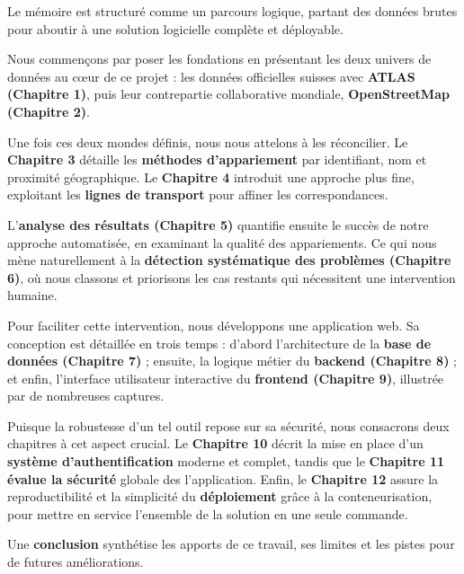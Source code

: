 Le mémoire est structuré comme un parcours logique, partant des données brutes pour aboutir à une solution logicielle complète et déployable. 

Nous commençons par poser les fondations en présentant les deux univers de données au cœur de ce projet : les données officielles suisses avec \textbf{ATLAS (Chapitre 1)}, puis leur contrepartie collaborative mondiale, \textbf{OpenStreetMap (Chapitre 2)}.

Une fois ces deux mondes définis, nous nous attelons à les réconcilier. Le \textbf{Chapitre 3} détaille les \textbf{méthodes d'appariement} par identifiant, nom et proximité géographique. Le \textbf{Chapitre 4} introduit une approche plus fine, exploitant les \textbf{lignes de transport} pour affiner les correspondances.

L'\textbf{analyse des résultats (Chapitre 5)} quantifie ensuite le succès de notre approche automatisée, en examinant la qualité des appariements. Ce qui nous mène naturellement à la \textbf{détection systématique des problèmes (Chapitre 6)}, où nous classons et priorisons les cas restants qui nécessitent une intervention humaine.

Pour faciliter cette intervention, nous développons une application web. Sa conception est détaillée en trois temps : d'abord l'architecture de la \textbf{base de données (Chapitre 7)} ; ensuite, la logique métier du \textbf{backend (Chapitre 8)} ; et enfin, l'interface utilisateur interactive du \textbf{frontend (Chapitre 9)}, illustrée par de nombreuses captures.

Puisque la robustesse d’un tel outil repose sur sa sécurité, nous consacrons deux chapitres à cet aspect crucial. Le \textbf{Chapitre 10} décrit la mise en place d'un \textbf{système d'authentification} moderne et complet, tandis que le \textbf{Chapitre 11} \textbf{évalue la sécurité} globale des l’application.
Enfin, le \textbf{Chapitre 12} assure la reproductibilité et la simplicité du \textbf{déploiement} grâce à la conteneurisation, pour mettre en service l'ensemble de la solution en une seule commande.

Une \textbf{conclusion} synthétise les apports de ce travail, ses limites et les pistes pour de futures améliorations.
